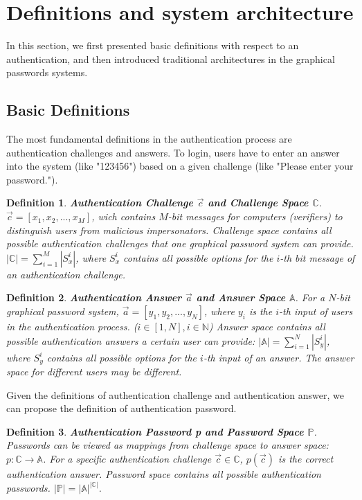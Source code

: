 \documentclass{article}
\newtheorem{definition}{Definition}
\begin{document}
  \section{Definitions and system architecture}
  \label{sec:preliminaries}
  In this section, we first presented basic definitions with respect to an authentication, and then introduced 
  traditional architectures in the graphical passwords systems.
  \subsection{Basic Definitions}
  The most fundamental definitions in the authentication process are authentication challenges and answers. To 
  login, users have to enter an answer into the system (like "123456") based on a given challenge (like "Please 
  enter your password.").
  \begin{definition}
    \textbf{Authentication Challenge $\vec c$ and Challenge Space $\mathbb{C}$}. $\vec c = [x_1, x_2,...,x_M]$, 
    wich contains $M$-bit messages for computers (verifiers) to distinguish users from malicious impersonators. 
    Challenge space contains all possible authentication challenges that one graphical password system can 
    provide. $|\mathbb{C}| = \sum\limits_{i=1}^{M}|S_x^i|$, where $S_x^i$ contains all possible options for 
    the $i$-th bit message of an authentication challenge.
  \end{definition}
  \begin{definition}
    \textbf{Authentication Answer $\vec a$ and Answer Space $\mathbb{A}$}. For a $N$-bit graphical password system, $\vec a = [y_1, y_2,...,y_N]$, 
    where $y_i$ is the $i$-th input of users in the authentication process. ($i \in [1, N], i \in \mathbb{N}$) 
    Answer space contains all possible authentication answers a certain user can provide: 
    $|\mathbb{A}| = \sum\limits_{i=1}^{N}|S_y^i|$, where $S_y^i$ contains all possible options for the $i$-th 
    input of an answer. The answer space for different users may be different.
  \end{definition}
  Given the definitions of authentication challenge and authentication answer, we can propose the 
  definition of authentication password.
  \begin{definition}
    \textbf{Authentication Password p and Password Space $\mathbb{P}$}. Passwords can be viewed as mappings from challenge space to answer space: 
    $p:\mathbb{C}\rightarrow\mathbb{A}$. For a specific authentication challenge $\vec c \in \mathbb{C}$, $p(\vec c)$ 
    is the correct authentication answer. Password space contains all possible authentication passwords. $|\mathbb{P}| 
    = |\mathbb{A}|^{|\mathbb{C}|}$.
  \end{definition}
  
\end{document}
